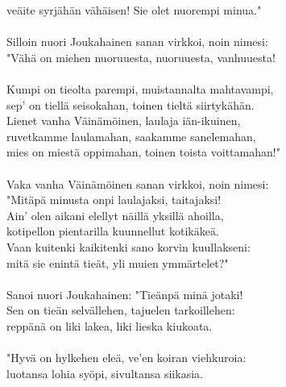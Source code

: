 veäite syrjähän vähäisen! Sie olet nuorempi minua."           \\
                                                              \\
Silloin nuori Joukahainen sanan virkkoi, noin nimesi:         \\
"Vähä on miehen nuoruuesta, nuoruuesta, vanhuuesta!           \\
                                                              \\
Kumpi on tieolta parempi, muistannalta mahtavampi,            \\
sep' on tiellä seisokahan, toinen tieltä siirtykähän.         \\
Lienet vanha Väinämöinen, laulaja iän-ikuinen,                \\
ruvetkamme laulamahan, saakamme sanelemahan,                  \\
mies on miestä oppimahan, toinen toista voittamahan!"         \\
                                                              \\
Vaka vanha Väinämöinen sanan virkkoi, noin nimesi:            \\
"Mitäpä minusta onpi laulajaksi, taitajaksi!                  \\
Ain' olen aikani elellyt näillä yksillä ahoilla,              \\
kotipellon pientarilla kuunnellut kotikäkeä.                  \\
Vaan kuitenki kaikitenki sano korvin kuullakseni:             \\
mitä sie enintä tieät, yli muien ymmärtelet?"                 \\
                                                              \\
Sanoi nuori Joukahainen: "Tieänpä minä jotaki!                \\
Sen on tieän selvällehen, tajuelen tarkoillehen:              \\
reppänä on liki lakea, liki lieska kiukoata.                  \\
                                                              \\
"Hyvä on hylkehen eleä, ve'en koiran viehkuroia:              \\
luotansa lohia syöpi, sivultansa siikasia.                    \\
                                                              \\
